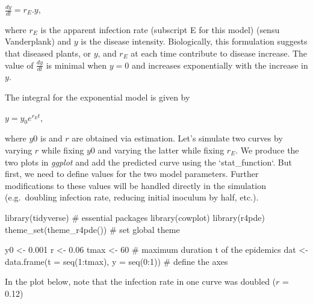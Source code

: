 \documentclass[
  letterpaper,
]{book}
\newenvironment{Shaded}{\begin{snugshade}}{\end{snugshade}}
\newcommand{\AttributeTok}[1]{\textcolor[rgb]{0.40,0.45,0.13}{#1}}
\newcommand{\CommentTok}[1]{\textcolor[rgb]{0.37,0.37,0.37}{#1}}
\newcommand{\DecValTok}[1]{\textcolor[rgb]{0.68,0.00,0.00}{#1}}
\newcommand{\FloatTok}[1]{\textcolor[rgb]{0.68,0.00,0.00}{#1}}
\newcommand{\FunctionTok}[1]{\textcolor[rgb]{0.28,0.35,0.67}{#1}}
\newcommand{\NormalTok}[1]{\textcolor[rgb]{0.00,0.23,0.31}{#1}}
\newcommand{\OtherTok}[1]{\textcolor[rgb]{0.00,0.23,0.31}{#1}}
\newcommand{\SpecialCharTok}[1]{\textcolor[rgb]{0.37,0.37,0.37}{#1}}
\begin{document}
\(\frac{dy}{dt} = r_E.y\),

where \(r_E\) is the apparent infection rate (subscript E for this
model) (sensu Vanderplank) and \(y\) is the disease intensity.
Biologically, this formulation suggests that diseased plants, or \(y\),
and \(r_E\) at each time contribute to disease increase. The value of
\(\frac{dy}{dt}\) is minimal when \(y = 0\) and increases exponentially
with the increase in \(y\).

The integral for the exponential model is given by

\(y = y_0 e^{r_Et}\),

where \(y0\) is and \(r\) are obtained via estimation. Let's simulate
two curves by varying \(r\) while fixing \(y0\) and varying the latter
while fixing \(r_E\). We produce the two plots in \emph{ggplot} and add
the predicted curve using the `stat\_function`. But first, we need to
define values for the two model parameters. Further modifications to
these values will be handled directly in the simulation (e.g.~doubling
infection rate, reducing initial inoculum by half, etc.).

\begin{Shaded}
\begin{Highlighting}[]
\FunctionTok{library}\NormalTok{(tidyverse) }\CommentTok{\# essential packages }
\FunctionTok{library}\NormalTok{(cowplot)}
\FunctionTok{library}\NormalTok{(r4pde)}
\FunctionTok{theme\_set}\NormalTok{(}\FunctionTok{theme\_r4pde}\NormalTok{()) }\CommentTok{\# set global theme}
\end{Highlighting}
\end{Shaded}

\begin{Shaded}
\begin{Highlighting}[]
\NormalTok{y0 }\OtherTok{\textless{}{-}} \FloatTok{0.001} 
\NormalTok{r }\OtherTok{\textless{}{-}} \FloatTok{0.06} 
\NormalTok{tmax }\OtherTok{\textless{}{-}} \DecValTok{60} \CommentTok{\# maximum duration t of the epidemics}
\NormalTok{dat }\OtherTok{\textless{}{-}} \FunctionTok{data.frame}\NormalTok{(}\AttributeTok{t =} \FunctionTok{seq}\NormalTok{(}\DecValTok{1}\SpecialCharTok{:}\NormalTok{tmax), }\AttributeTok{y =} \FunctionTok{seq}\NormalTok{(}\DecValTok{0}\SpecialCharTok{:}\DecValTok{1}\NormalTok{)) }\CommentTok{\# define the axes}
\end{Highlighting}
\end{Shaded}

In the plot below, note that the infection rate in one curve was doubled
(\(r\) = 0.12)
\end{document}
